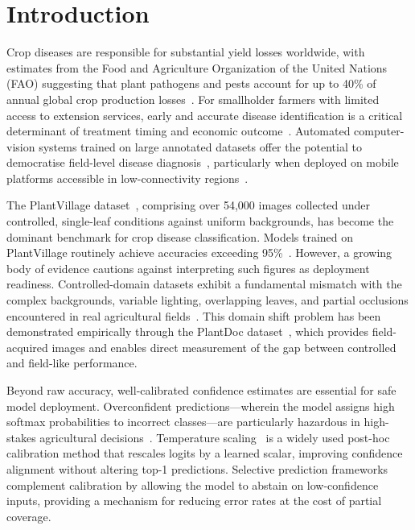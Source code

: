 \documentclass[conference]{IEEEtran}
\begin{document}
\section{Introduction}
\label{sec:introduction}

Crop diseases are responsible for substantial yield losses worldwide,
with estimates from the Food and Agriculture Organization of the
United Nations (FAO) suggesting that plant pathogens and pests account
for up to 40\% of annual global crop production
losses~\cite{savary2019global}. For smallholder farmers
with limited access to extension services, early and accurate disease
identification is a critical determinant of treatment timing and
economic outcome~\cite{ramcharan2017deep}. Automated
computer-vision systems trained on large annotated datasets offer the
potential to democratise field-level disease
diagnosis~\cite{mohanty2016deep,ferentinos2018deep}, particularly
when deployed on mobile platforms accessible in low-connectivity
regions~\cite{ramcharan2017deep,atila2021plant}.

The PlantVillage dataset~\cite{hughes2015open}, comprising over
54{,}000 images collected under controlled, single-leaf conditions
against uniform backgrounds, has become the dominant benchmark for crop
disease classification. Models trained on PlantVillage routinely
achieve accuracies exceeding
95\%~\cite{mohanty2016deep,too2019comparative,kamilaris2018deep}.
However, a growing body of evidence cautions against interpreting such
figures as deployment readiness. Controlled-domain datasets exhibit a
fundamental mismatch with the complex backgrounds, variable lighting,
overlapping leaves, and partial occlusions encountered in real
agricultural
fields~\cite{ferentinos2018deep,barbedo2018factors}.
This domain shift problem has been demonstrated empirically through the
PlantDoc dataset~\cite{singh2020plantdoc}, which provides
field-acquired images and enables direct measurement of the gap between
controlled and field-like performance.

Beyond raw accuracy, well-calibrated confidence estimates are essential
for safe model deployment. Overconfident predictions---wherein the
model assigns high softmax probabilities to incorrect classes---are
particularly hazardous in high-stakes agricultural
decisions~\cite{guo2017calibration}. Temperature
scaling~\cite{guo2017calibration} is a widely used post-hoc
calibration method that rescales logits by a learned scalar, improving
confidence alignment without altering top-1 predictions. Selective
prediction
frameworks~\cite{geifman2017selective} complement
calibration by allowing the model to abstain on low-confidence inputs,
providing a mechanism for reducing error rates at the cost of partial
coverage.
\end{document}
